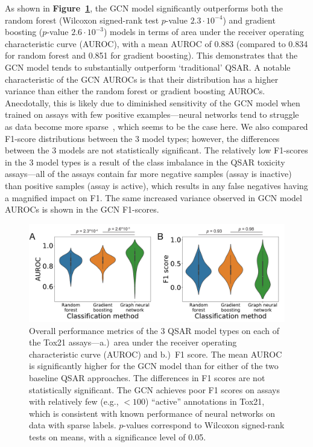 \documentclass{ws-procs11x85}
\begin{document}
As shown in \textbf{Figure~\ref{fig:3}}, the GCN model significantly outperforms both the random forest (Wilcoxon signed-rank test $p$-value $2.3\cdot10^{-4}$) and gradient boosting ($p$-value $2.6\cdot10^{-3}$) models in terms of area under the receiver operating characteristic curve (AUROC), with a mean AUROC of 0.883 (compared to 0.834 for random forest and 0.851 for gradient boosting).
This demonstrates that the GCN model tends to substantially outperform `traditional' QSAR.
A notable characteristic of the GCN AUROCs is that their distribution has a higher variance than either the random forest or gradient boosting AUROCs.
Anecdotally, this is likely due to diminished sensitivity of the GCN model when trained on assays with few positive examples---neural networks tend to struggle as data become more sparse~\cite{liu2020finding}, which seems to be the case here.
We also compared F1-score distributions between the 3 model types; however, the differences between the 3 models are not statistically significant.
The relatively low F1-scores in the 3 model types is a result of the class imbalance in the QSAR toxicity assays---all of the assays contain far more negative samples (assay is inactive) than positive samples (assay is active), which results in any false negatives having a magnified impact on F1.
The same increased variance observed in GCN model AUROCs is shown in the GCN F1-scores.

\begin{figure}
   \centering
   \includegraphics[width=\textwidth]{figures/figure3.pdf}
   \caption{Overall performance metrics of the 3 QSAR model types on each of the Tox21 assays---a.)~area under the receiver operating characteristic curve (AUROC) and b.)~F1 score. The mean AUROC is significantly higher for the GCN model than for either of the two baseline QSAR approaches. The differences in F1 scores are not statistically significant. The GCN achieves poor F1 scores on assays with relatively few (e.g., $< 100$) ``active'' annotations in Tox21, which is consistent with known performance of neural networks on data with sparse labels. $p$-values correspond to Wilcoxon signed-rank tests on means, with a significance level of 0.05.}\label{fig:3}
\end{figure}
\end{document}

